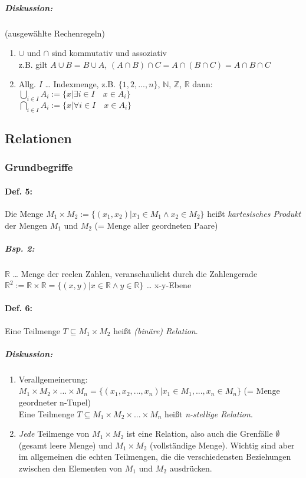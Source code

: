 \subparagraph{Diskussion:} (ausgewählte Rechenregeln)
\begin{enumerate}
\item $\cup$ und $\cap$ sind kommutativ und assoziativ\\
z.B. gilt $A \cup B = B\cup A$, $(A\cap B)\cap C = A \cap (B \cap C) = A \cap B \cap C$
\item Allg. $I$ … Indexmenge, z.B. $\{1,2,...,n\}$, $\mathbb{N}$, $\mathbb{Z}$, $\mathbb{R}$ dann:\\
$\bigcup_{i\in I}A_i := \{x| \exists i \in I \quad x \in A_i\}$\\
$\bigcap_{i\in I}A_i := \{x| \forall i \in I \quad x \in A_i\}$
\end{enumerate}

\subsection{Relationen}

\subsubsection{Grundbegriffe}

\paragraph{Def. 5:} \parskp
Die Menge $M_1 \times M_2 := \{ (x_1,x_2) | x_1 \in M_1 \wedge x_2 \in M_2\}$ heißt \emph{kartesisches Produkt} der Mengen $M_1$ und $M_2$ (= Menge aller geordneten Paare)

\subparagraph{Bsp. 2:} \parskp
$\mathbb{R}$ … Menge der reelen Zahlen, veranschaulicht durch die Zahlengerade\\
$\mathbb{R}^2 := \mathbb{R} \times \mathbb{R} = \{ (x,y) | x \in \mathbb{R} \wedge y \in \mathbb{R}\}$ … x-y-Ebene

\paragraph{Def. 6:} \parskp
Eine Teilmenge $T \subseteq M_1 \times M_2$ heißt \emph{(binäre) Relation}.

\subparagraph{Diskussion:}
\begin{enumerate}
\item Verallgemeinerung: $M_1 \times M_2 \times ... \times M_n= \{ (x_1, x_2, ..., x_n) | x_1 \in M_1, ..., x_n \in M_n\}$
(= Menge geordneter n-Tupel)\\
Eine Teilmenge $T\subseteq M_1 \times M_2 \times ... \times M_n$ heißt \emph{n-stellige Relation}.
\item \emph{Jede} Teilmenge von $M_1\times M_2$ ist eine Relation, also auch die Grenfälle $\emptyset$ (gesamt leere Menge) und $M_1\times M_2$ (vollständige Menge). Wichtig sind aber im allgemeinen die echten Teilmengen, die die verschiedensten Beziehungen zwischen den Elementen von $M_1$ und $M_2$ ausdrücken.
\end{enumerate}

